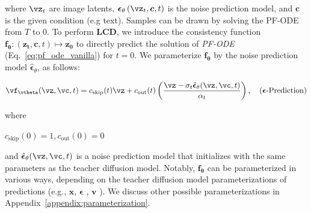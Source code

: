 \documentclass{article} %
\begin{document}
where $\boldsymbol{\vz}_t$ are image latents, $\boldsymbol{\epsilon}_\theta\left(\boldsymbol{\vz}_t, \boldsymbol{c}, t\right)$ is the noise prediction model, and $\boldsymbol{c}$ is the given condition (e.g text). Samples can be drawn by solving the PF-ODE from $T$ to $0$. To perform \textbf{LCD}, we introduce the consistency function 
$
\boldsymbol{f_{\theta}}: (\boldsymbol{z_t}, \boldsymbol{c}, t) \mapsto \boldsymbol{z_0}
$
to directly predict the solution of {\em{PF-ODE}} (Eq.~\ref{eq:pf_ode_vanilla}) for $t=0$. 
We parameterize $\boldsymbol{f_{\theta}}$ by the noise prediction model $\hat{\boldsymbol{\epsilon}}_\theta$, as follows:
\begin{footnotesize}
\begin{equation}
    \vf_\vtheta(\vz, \vc, t)=c_{\text{skip}}(t)\vz+c_{\text{out}}(t)\left(\frac{\vz - \sigma_t \hat{\boldsymbol{\epsilon}}_\theta(\vz, \vc,t)}{\alpha_t}\right),\quad (\boldsymbol{\epsilon}\text{-Prediction})
    \label{eq:parameterization}
\end{equation}
\end{footnotesize}
where \begin{small}$c_{\text{skip}}(0)=1, c_{\text{out}}(0)=0$\end{small}
and $\hat{\boldsymbol{\epsilon}}_\theta(\vz, \vc,t)$ is a noise prediction model that initializes with the same parameters as the teacher diffusion model. Notably, $\boldsymbol{f_{\theta}}$ can be parameterized in various ways, depending on the teacher diffusion model parameterizations of predictions (e.g., $\boldsymbol{x}$, $\boldsymbol{\epsilon}$ \citep{ho2020denoising}, $\boldsymbol{v}$ \citep{salimans2022progressive}). We discuss other possible parameterizations in Appendix~\ref{appendix:parameterization}.
\end{document}
